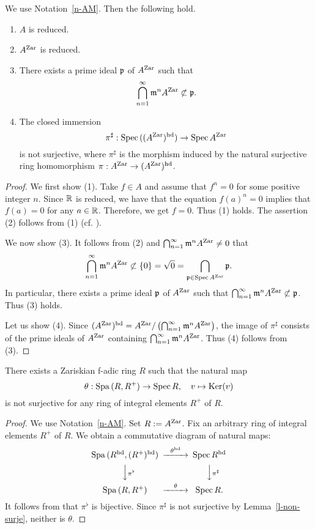 \begin{lem}\label{l-non-surje}
We use Notation~\ref{n-AM}. 
Then the following hold. 
\begin{enumerate}
\item $A$ is reduced. 
\item $A^{{\operatorname{Zar}}}$ is reduced. 
\item There exists a prime ideal $\mathfrak{p}$ of $A^{{\operatorname{Zar}}}$ 
such that 
$$\bigcap_{n=1}^{\infty} \mathfrak{m}^n A^{{\operatorname{Zar}}} \not\subset \mathfrak{p}.$$ 
\item The closed immersion 
$$\pi^{\sharp}:{\operatorname{Spec}}\,((A^{{\operatorname{Zar}}})^{{\operatorname{hd}}}) \to {\operatorname{Spec}}\,A^{{\operatorname{Zar}}}$$
is not surjective, where $\pi^{\sharp}$ is the morphism 
induced by the natural surjective ring homomorphism 
$\pi:A^{{\operatorname{Zar}}} \to (A^{{\operatorname{Zar}}})^{{\operatorname{hd}}}$.
\end{enumerate}
\end{lem}

\begin{proof}
We first show (1). 
Take $f \in A$ and assume that $f^n=0$ for some positive integer $n$. 
Since $\mathbb{R}$ is reduced, we have that 
the equation $f(a)^n=0$ implies that $f(a)=0$ for any $a \in \mathbb{R}$. 
Therefore, we get $f=0$. 
Thus (1) holds. 
The assertion (2) follows from (1) (cf. \cite[Corollary 3.12]{AM69}). 




We now show (3). 
It follows from (2) and $\bigcap_{n=1}^{\infty} \mathfrak{m}^n A^{{\operatorname{Zar}}} \neq 0$ that 
$$\bigcap_{n=1}^{\infty} \mathfrak{m}^n A^{{\operatorname{Zar}}} \not\subset \{0\}=\sqrt{0}=\bigcap_{\mathfrak{p} \in {\operatorname{Spec}}\,A^{{\operatorname{Zar}}}} \mathfrak{p}.$$
In particular, there exists a prime ideal $\mathfrak{p}$ of $A^{{\operatorname{Zar}}}$ 
such that $\bigcap_{n=1}^{\infty} \mathfrak{m}^n A^{{\operatorname{Zar}}} \not\subset \mathfrak{p}$. 
Thus (3) holds. 


Let us show (4). 
Since $(A^{{\operatorname{Zar}}})^{{\operatorname{hd}}}=A^{{\operatorname{Zar}}}/\left( \bigcap_{n=1}^{\infty} \mathfrak{m}^n A^{{\operatorname{Zar}}}\right)$, 
the image of $\pi^{\sharp}$ consists of the prime ideals of $A^{{\operatorname{Zar}}}$ 
containing $\bigcap_{n=1}^{\infty} \mathfrak{m}^n A^{{\operatorname{Zar}}}$. 
Thus (4) follows from (3). 
\end{proof}




\begin{thm}\label{t-non-surje}
There exists a Zariskian f-adic ring $R$ such that the natural map 
$$\theta:{\operatorname{Spa}}\,(R, R^+) \to {\operatorname{Spec}}\,R, \quad v \mapsto {\operatorname{Ker}}(v)$$
is not surjective for any ring of integral elements $R^+$ of $R$. 
\end{thm}

\begin{proof}
We use Notation~\ref{n-AM}. 
Set $R:=A^{{\operatorname{Zar}}}$. 
Fix an arbitrary ring of integral elements $R^+$ of $R$. 
We obtain a commutative diagram of natural maps: 
$$\begin{CD}
\Spa\,(R^{\hd}, (R^+)^{\hd}) @>\theta^{\hd}>> \Spec\,R^{\hd}\\
@VV\pi^{\flat}V @VV\pi^{\sharp} V\\
\Spa\,(R, R^+) @>\theta >> \Spec\,R.
\end{CD}$$
It follows from \cite[Proposition 3.9]{Hub93} that $\pi^{\flat}$ is bijective. 
Since $\pi^{\sharp}$ is not surjective by Lemma~\ref{l-non-surje}, 
neither is $\theta$. 
\end{proof}


